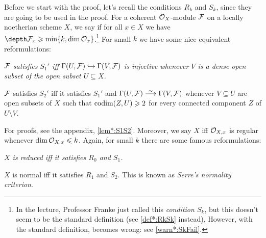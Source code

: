 \begin{rem}\label{rem:RkSk}
	Before we start with the proof, let's recall the conditions $R_k$ and $S_k$, since they are going to be used in the proof. For a coherent $\mathcal{O}_X$-module $\mathcal{F}$ on a locally noetherian scheme $X$, we say  if for all $x\in X$ we have $\depth\Ff_x\geq \min\{k,\dim\Oo_x\}$.\footnote{In the lecture, Professor Franke just called this \emph{condition $S_k$}, but this doesn't seem to be the standard definition (see \cref{def*:RkSk} instead), However, with the standard definition,  becomes wrong: see \cref{warn*:SkFail}.} For small $k$ we have some nice equivalent reformulations:
	\begin{numerate}
		\item \itshape $\mathcal{F}$ satisfies $S_1'$ iff $\Gamma(U,\Ff)\monomorphism\Global(V,\Ff)$ is injective whenever $V$ is a dense open subset of the open subset $U\subseteq X$.
		\item $\mathcal{F}$ satisfies $S_2'$ iff it satisfies $S_1'$ and $\Global(U,\Ff)\isomorphism\Global(V,\Ff)$ whenever $V\subseteq U$ are open subsets of $X$ such that $\operatorname{codim}(Z,U)\geqslant 2$ for every connected component $Z$ of $U\setminus V$.
	\end{numerate}
	For proofs, see the appendix, \cref{lem*:S1S2}. Moreover, we say $X$  iff $\mathcal{O}_{X,x}$ is regular whenever $\dim\mathcal{O}_{X,x}\leqslant k$. Again, for small $k$ there are some famous reformulations:
	\begin{alphanumerate}
		\item \itshape $X$ is reduced iff it satisfies $R_0$ and $S_1$.
		\item $X$ is normal iff it satisfies $R_1$ and $S_2$. This is known as \emph{Serre's normality criterion}.
	\end{alphanumerate}
\end{rem}
